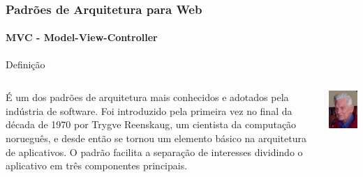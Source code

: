\documentclass[
	9pt, %
	t, %
]{beamer}
\begin{document}
\begin{frame}
	\frametitle{Padrões de Arquitetura para Web}
	\framesubtitle{MVC - Model-View-Controller}

	\begin{block}{Definição}
	\begin{columns}[c] %
			\begin{column}{0.8\textwidth} %
				É um dos padrões de arquitetura mais conhecidos e adotados pela indústria de software. Foi introduzido pela primeira vez no final da década de 1970 por Trygve Reenskaug, um cientista da computação norueguês, e desde então se tornou um elemento básico na arquitetura de aplicativos. O padrão facilita a separação de interesses dividindo o aplicativo em três componentes principais.
			\end{column}

			\begin{column}{0.2\textwidth} %
				\includegraphics[width=0.9\linewidth]{Images/reenskaug.jpg}
			\end{column}
		\end{columns}
	\end{block}

\end{frame}
\end{document}
